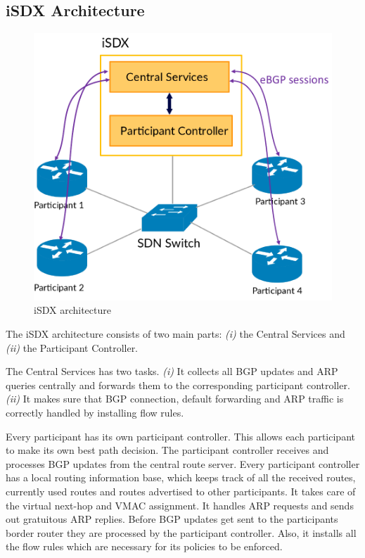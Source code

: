 \subsection{\label{chapter2:iSDX:iSDX_architecture}iSDX Architecture}
\begin{figure}[h]
\includegraphics[scale = 0.4]{Figures/isdx_architecture_cropped.pdf}
\caption{iSDX architecture}
\end{figure}

The iSDX architecture consists of two main parts: \emph{(i)} the Central Services and \emph{(ii)} the Participant Controller.

The Central Services has two tasks. \emph{(i)} It collects all BGP updates and ARP queries centrally and forwards them to the corresponding participant controller. \emph{(ii)} It makes sure that BGP connection, default forwarding and ARP traffic is correctly handled by installing flow rules.

Every participant has its own participant controller. This allows each participant to make its own best path decision. The participant controller receives and processes BGP updates from the central route server. Every participant controller has a local routing information base, which keeps track of all the received routes, currently used routes and routes advertised to other participants. It takes care of the virtual next-hop and VMAC assignment. It handles ARP requests and sends out gratuitous ARP replies. Before BGP updates get sent to the participants border router they are processed by the participant controller. Also, it installs all the flow rules which are necessary for its policies to be enforced.

